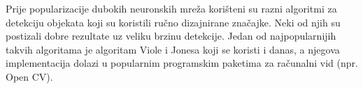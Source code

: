 Prije popularizacije dubokih neuronskih mreža korišteni su razni algoritmi za detekciju objekata koji su koristili ručno dizajnirane značajke. Neki od njih su postizali dobre rezultate uz veliku brzinu detekcije. Jedan od najpopularnijih takvih algoritama je algoritam Viole i Jonesa koji se koristi i danas, a njegova implementacija dolazi u popularnim programskim paketima za računalni vid (npr. Open CV).